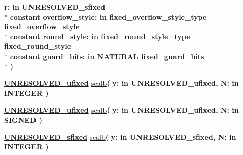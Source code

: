 \begin{DoxyCompactItemize}
{\bfseries \textcolor{vhdlchar}{r\+: }\textcolor{stringliteral}{in }\textcolor{vhdlchar}{U\+N\+R\+E\+S\+O\+L\+V\+E\+D\+\_\+sfixed}}\\*
{\bfseries {\bfseries \textcolor{keywordflow}{constant}\textcolor{vhdlchar}{ }}\textcolor{vhdlchar}{overflow\+\_\+style\+: }\textcolor{stringliteral}{in }\textcolor{vhdlchar}{fixed\+\_\+overflow\+\_\+style\+\_\+type     fixed\+\_\+overflow\+\_\+style}}\\*
{\bfseries {\bfseries \textcolor{keywordflow}{constant}\textcolor{vhdlchar}{ }}\textcolor{vhdlchar}{round\+\_\+style\+: }\textcolor{stringliteral}{in }\textcolor{vhdlchar}{fixed\+\_\+round\+\_\+style\+\_\+type     fixed\+\_\+round\+\_\+style}}\\*
{\bfseries {\bfseries \textcolor{keywordflow}{constant}\textcolor{vhdlchar}{ }}\textcolor{vhdlchar}{guard\+\_\+bits\+: }\textcolor{stringliteral}{in }\textcolor{vhdlchar}{N\+A\+T\+U\+R\+A\+L     fixed\+\_\+guard\+\_\+bits}}\\*
{\bfseries  )} 
\item 
{\bfseries {\bfseries {\bfseries \hyperlink{classfixed__pkg_ae78bc2b36d22f6abeac163955e8a587d}{U\+N\+R\+E\+S\+O\+L\+V\+E\+D\+\_\+ufixed}} \textcolor{vhdlchar}{ }}} \hyperlink{classfixed__pkg_a991487fdeca1541f633acc7ebb85598b}{scalb}{\bfseries  ( }{\bfseries \textcolor{vhdlchar}{y\+: }\textcolor{stringliteral}{in }\textcolor{vhdlchar}{U\+N\+R\+E\+S\+O\+L\+V\+E\+D\+\_\+ufixed}}{\bfseries  , \textcolor{vhdlchar}{N\+: }\textcolor{stringliteral}{in }{\bfseries \textcolor{comment}{I\+N\+T\+E\+G\+E\+R}\textcolor{vhdlchar}{ }}}{\bfseries  )} 
\item 
{\bfseries {\bfseries {\bfseries \hyperlink{classfixed__pkg_ae78bc2b36d22f6abeac163955e8a587d}{U\+N\+R\+E\+S\+O\+L\+V\+E\+D\+\_\+ufixed}} \textcolor{vhdlchar}{ }}} \hyperlink{classfixed__pkg_a991487fdeca1541f633acc7ebb85598b}{scalb}{\bfseries  ( }{\bfseries \textcolor{vhdlchar}{y\+: }\textcolor{stringliteral}{in }\textcolor{vhdlchar}{U\+N\+R\+E\+S\+O\+L\+V\+E\+D\+\_\+ufixed}}{\bfseries  , \textcolor{vhdlchar}{N\+: }\textcolor{stringliteral}{in }{\bfseries \textcolor{comment}{S\+I\+G\+N\+E\+D}\textcolor{vhdlchar}{ }}}{\bfseries  )} 
\item 
{\bfseries {\bfseries {\bfseries \hyperlink{classfixed__pkg_aa723b28a027c3c0f9bca02d75e8df4d6}{U\+N\+R\+E\+S\+O\+L\+V\+E\+D\+\_\+sfixed}} \textcolor{vhdlchar}{ }}} \hyperlink{classfixed__pkg_a3b0a3ce1dfacad6ea0446802d2f6aad7}{scalb}{\bfseries  ( }{\bfseries \textcolor{vhdlchar}{y\+: }\textcolor{stringliteral}{in }\textcolor{vhdlchar}{U\+N\+R\+E\+S\+O\+L\+V\+E\+D\+\_\+sfixed}}{\bfseries  , \textcolor{vhdlchar}{N\+: }\textcolor{stringliteral}{in }{\bfseries \textcolor{comment}{I\+N\+T\+E\+G\+E\+R}\textcolor{vhdlchar}{ }}}{\bfseries  )} 

\end{DoxyCompactItemize}

